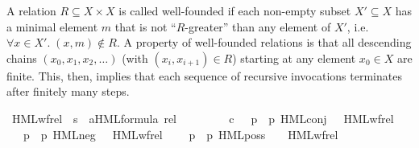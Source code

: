 \begin{isabellebody}
\begin{isamarkuptext}
A relation $R \subseteq X \times X$ is called well-founded if each non-empty subset $X' \subseteq X$ has a minimal element $m$ that is not \enquote{$R$-greater} than any element of $X'$, i.e.\@ $\forall x \in X'.\; (x,m) \notin R$.
A property of well-founded relations is that all descending chains $(x_0, x_1, x_2, \dots)$ (with $(x_i, x_{i+1}) \in R$) starting at any element $x_0 \in X$ are finite. This, then, implies that each sequence of recursive invocations terminates after finitely many steps.%
\end{isamarkuptext}\isamarkuptrue%
\isamarkupfalse%
\ HML{\isacharunderscore}{\kern0pt}wf{\isacharunderscore}{\kern0pt}rel\ {\isacharcolon}{\kern0pt}{\isacharcolon}{\kern0pt}\ {\isacartoucheopen}{\isacharparenleft}{\kern0pt}{\isacharprime}{\kern0pt}s\ {\isasymtimes}\ {\isacharparenleft}{\kern0pt}{\isacharprime}{\kern0pt}a{\isacharparenright}{\kern0pt}HML{\isacharunderscore}{\kern0pt}formula{\isacharparenright}{\kern0pt}\ rel{\isacartoucheclose}\ \isanewline
\ \ \isanewline
\ \ \ \ {\isacartoucheopen}{\isasymphi}\ {\isasymin}\isactrlsub c\ {\isasymPhi}\ {\isasymLongrightarrow}\ {\isacharparenleft}{\kern0pt}{\isacharparenleft}{\kern0pt}p{\isacharcomma}{\kern0pt}\ {\isasymphi}{\isacharparenright}{\kern0pt}{\isacharcomma}{\kern0pt}\ {\isacharparenleft}{\kern0pt}p{\isacharcomma}{\kern0pt}\ HML{\isacharunderscore}{\kern0pt}conj\ {\isasymPhi}{\isacharparenright}{\kern0pt}{\isacharparenright}{\kern0pt}\ {\isasymin}\ HML{\isacharunderscore}{\kern0pt}wf{\isacharunderscore}{\kern0pt}rel{\isacartoucheclose}\ \isanewline
\ \ {\isacharbar}{\kern0pt}\ {\isacartoucheopen}{\isacharparenleft}{\kern0pt}{\isacharparenleft}{\kern0pt}p{\isacharcomma}{\kern0pt}\ {\isasymphi}{\isacharparenright}{\kern0pt}{\isacharcomma}{\kern0pt}\ {\isacharparenleft}{\kern0pt}p{\isacharcomma}{\kern0pt}\ HML{\isacharunderscore}{\kern0pt}neg\ {\isasymphi}{\isacharparenright}{\kern0pt}{\isacharparenright}{\kern0pt}\ {\isasymin}\ HML{\isacharunderscore}{\kern0pt}wf{\isacharunderscore}{\kern0pt}rel{\isacartoucheclose}\ \isanewline
\ \ {\isacharbar}{\kern0pt}\ {\isacartoucheopen}{\isacharparenleft}{\kern0pt}{\isacharparenleft}{\kern0pt}p{\isacharcomma}{\kern0pt}\ {\isasymphi}{\isacharparenright}{\kern0pt}{\isacharcomma}{\kern0pt}\ {\isacharparenleft}{\kern0pt}p{\isacharprime}{\kern0pt}{\isacharcomma}{\kern0pt}\ HML{\isacharunderscore}{\kern0pt}poss\ {\isasymalpha}\ {\isasymphi}{\isacharparenright}{\kern0pt}{\isacharparenright}{\kern0pt}\ {\isasymin}\ HML{\isacharunderscore}{\kern0pt}wf{\isacharunderscore}{\kern0pt}rel{\isacartoucheclose}\isanewline

\end{isabellebody}
